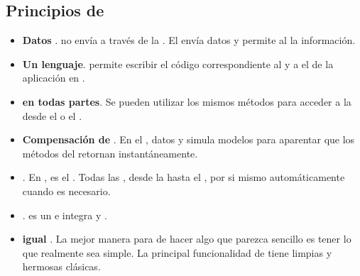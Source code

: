 \subsection{Principios de \meteorNAME}
\begin{itemize}
	\item \textbf{Datos \onthewire}. \meteorNAME no envía \htmlNAME a través de la \networkINT. El \serverAS envía datos y permite al \clientAS \renderCPT la información.

	\item \textbf{Un lenguaje}. \meteorNAME permite escribir el código correspondiente al \clientAS y a el \serverAS de la aplicación en \javaScriptNAME.
	\item \textbf{\dataBaseDB en todas partes}. Se pueden utilizar los mismos métodos para acceder a la \dataBaseDB desde el \clientAS o el \serverAS.

	\item \textbf{Compensación de \latency}. En el \clientAS, \meteorNAME \prefetches datos y simula modelos para aparentar que los métodos del \serverAS retornan instantáneamente.

	\item \textbf{\fullstackAS \reactivity}. En \meteorNAME, \realTimeINT es el . Todas las \layers, desde la \dataBaseDB hasta el \templateAS, \update por si mismo automáticamente cuando es necesario.

	\item \textbf{\embraceecosystem}. \meteorNAME es un \openSourcePC e integra \toolsCPT y \frameworksPC \openSourcePC.

	\item \textbf{\simplicity igual \productivity}. La mejor manera para de hacer algo que parezca sencillo es tener lo que realmente sea simple. La principal funcionalidad de \meteorNAME tiene limpias y hermosas \apisAS clásicas.

\end{itemize}

